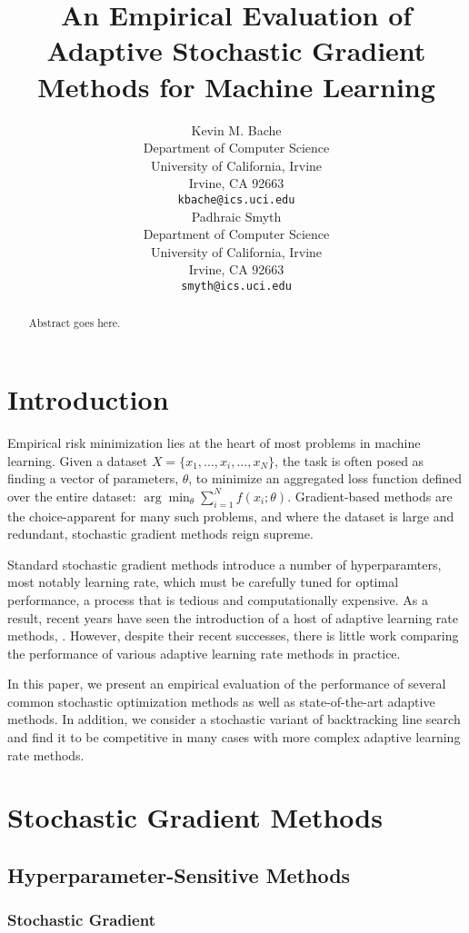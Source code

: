 \documentclass{article} %
\title{An Empirical Evaluation of Adaptive Stochastic Gradient Methods for Machine Learning}
\author{
Kevin M. Bache \\
Department of Computer Science\\
University of California, Irvine\\
Irvine, CA 92663 \\
\texttt{kbache@ics.uci.edu} \\
\And
Padhraic Smyth \\
Department of Computer Science\\
University of California, Irvine\\
Irvine, CA 92663 \\
\texttt{smyth@ics.uci.edu} \\
}
\begin{document}
\maketitle

\begin{abstract}
Abstract goes here.
\end{abstract}

\section{Introduction}
Empirical risk minimization lies at the heart of most problems in machine learning.  Given a dataset $X = \{x_1, ..., x_i, ..., x_N\}$, the task is often posed as finding a vector of parameters, $\theta$, to minimize an aggregated loss function defined over the entire dataset: $\arg\min_{\theta} \sum_{i=1}^N f(x_i; \theta)$.  Gradient-based methods are the choice-apparent for many such problems, and where the dataset is large and redundant, stochastic gradient methods reign supreme. 

Standard stochastic gradient methods introduce a number of hyperparamters, most notably learning rate, which must be carefully tuned for optimal performance, a process that is tedious and computationally expensive.  As a result, recent years have seen the introduction of a host of adaptive learning rate methods, \citep{schaul_no_2012, zeiler_adadelta:_2012, kingma2014adam, bache2014hot}.  However, despite their recent successes, there is little work comparing the performance of various adaptive learning rate methods in practice.  

In this paper, we present an empirical evaluation of the performance of several common stochastic optimization methods as well as state-of-the-art adaptive methods.  In addition, we consider a stochastic variant of backtracking line search and find it to be competitive in many cases with more complex adaptive learning rate methods.

\section{Stochastic Gradient Methods}
\subsection{Hyperparameter-Sensitive Methods}
\subsubsection{Stochastic Gradient}
\citep{robbins_stochastic_1951}
\end{document}
